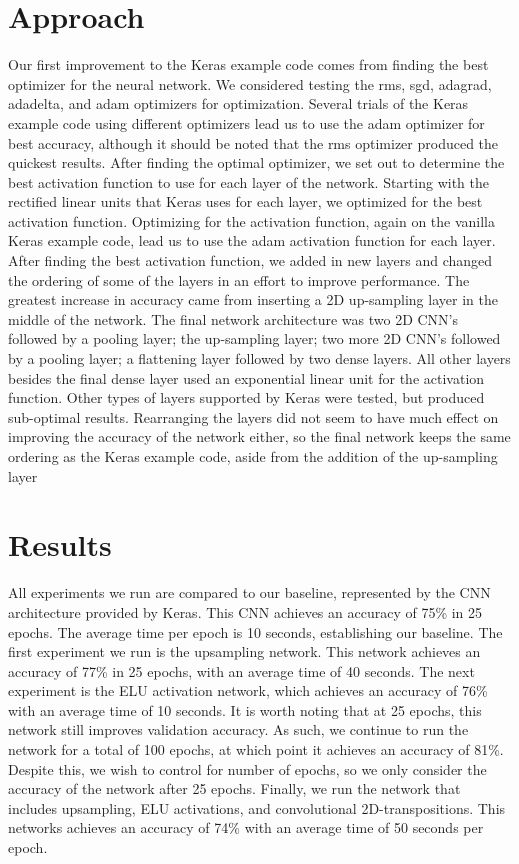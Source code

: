 \documentclass{article}
\begin{document}
\section{Approach}
Our first improvement to the Keras example code comes from finding the best optimizer for the neural network. We considered testing the rms, sgd, adagrad, adadelta, and adam optimizers for optimization. Several trials of the Keras example code using different optimizers lead us to use the adam optimizer for best accuracy, although it should be noted that the rms optimizer produced the quickest results. After finding the optimal optimizer, we set out to determine the best activation function to use for each layer of the network. Starting with the rectified linear units that Keras uses for each layer, we optimized for the best activation function. Optimizing for the activation function, again on the vanilla Keras example code, lead us to use the adam activation function for each layer. After finding the best activation function, we added in new layers and changed the ordering of some of the layers in an effort to improve performance. The greatest increase in accuracy came from inserting a 2D up-sampling layer in the middle of the network. 
The final network architecture was two 2D CNN’s followed by a pooling layer; the up-sampling layer; two more 2D CNN’s followed by a pooling layer; a flattening layer followed by two dense layers. All other layers besides the final dense layer used an exponential linear unit for the activation function. Other types of layers supported by Keras were tested, but produced sub-optimal results. Rearranging the layers did not seem to have much effect on improving the accuracy of the network either, so the final network keeps the same ordering as the Keras example code, aside from the addition of the up-sampling layer


\section{Results}
All experiments we run are compared to our baseline, represented by the CNN architecture provided by Keras. This CNN achieves an accuracy of 75\% in 25 epochs. The average time per epoch is 10 seconds, establishing our baseline. The first experiment we run is the upsampling network. This network achieves an accuracy of 77\% in 25 epochs, with an average time of 40 seconds. The next experiment is the ELU activation network, which achieves an accuracy of 76\% with an average time of 10 seconds. It is worth noting that at 25 epochs, this network still improves validation accuracy. As such, we continue to run the network for a total of 100 epochs, at which point it achieves an accuracy of 81\%. Despite this, we wish to control for number of epochs, so we only consider the accuracy of the network after 25 epochs. Finally, we run the network that includes upsampling, ELU activations, and convolutional 2D-transpositions. This networks achieves an accuracy of 74\% with an average time of 50 seconds per epoch.
\end{document}
